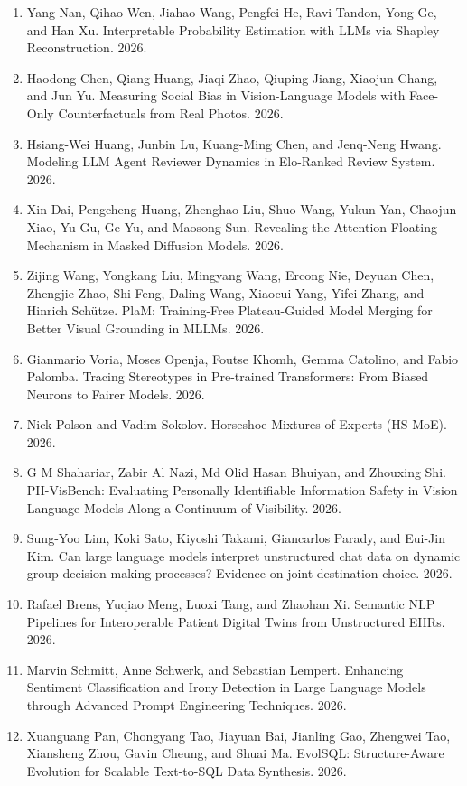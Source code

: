 \documentclass{article}
\begin{document}
\begin{enumerate}
\item
Yang Nan, Qihao Wen, Jiahao Wang, Pengfei He, Ravi Tandon, Yong Ge, and Han Xu. Interpretable Probability Estimation with LLMs via Shapley Reconstruction. 2026.
\item
Haodong Chen, Qiang Huang, Jiaqi Zhao, Qiuping Jiang, Xiaojun Chang, and Jun Yu. Measuring Social Bias in Vision-Language Models with Face-Only Counterfactuals from Real Photos. 2026.
\item
Hsiang-Wei Huang, Junbin Lu, Kuang-Ming Chen, and Jenq-Neng Hwang. Modeling LLM Agent Reviewer Dynamics in Elo-Ranked Review System. 2026.
\item
Xin Dai, Pengcheng Huang, Zhenghao Liu, Shuo Wang, Yukun Yan, Chaojun Xiao, Yu Gu, Ge Yu, and Maosong Sun. Revealing the Attention Floating Mechanism in Masked Diffusion Models. 2026.
\item
Zijing Wang, Yongkang Liu, Mingyang Wang, Ercong Nie, Deyuan Chen, Zhengjie Zhao, Shi Feng, Daling Wang, Xiaocui Yang, Yifei Zhang, and Hinrich Schütze. PlaM: Training-Free Plateau-Guided Model Merging for Better Visual Grounding in MLLMs. 2026.
\item
Gianmario Voria, Moses Openja, Foutse Khomh, Gemma Catolino, and Fabio Palomba. Tracing Stereotypes in Pre-trained Transformers: From Biased Neurons to Fairer Models. 2026.
\item
Nick Polson and Vadim Sokolov. Horseshoe Mixtures-of-Experts (HS-MoE). 2026.
\item
G M Shahariar, Zabir Al Nazi, Md Olid Hasan Bhuiyan, and Zhouxing Shi. PII-VisBench: Evaluating Personally Identifiable Information Safety in Vision Language Models Along a Continuum of Visibility. 2026.
\item
Sung-Yoo Lim, Koki Sato, Kiyoshi Takami, Giancarlos Parady, and Eui-Jin Kim. Can large language models interpret unstructured chat data on dynamic group decision-making processes? Evidence on joint destination choice. 2026.
\item
Rafael Brens, Yuqiao Meng, Luoxi Tang, and Zhaohan Xi. Semantic NLP Pipelines for Interoperable Patient Digital Twins from Unstructured EHRs. 2026.
\item
Marvin Schmitt, Anne Schwerk, and Sebastian Lempert. Enhancing Sentiment Classification and Irony Detection in Large Language Models through Advanced Prompt Engineering Techniques. 2026.
\item
Xuanguang Pan, Chongyang Tao, Jiayuan Bai, Jianling Gao, Zhengwei Tao, Xiansheng Zhou, Gavin Cheung, and Shuai Ma. EvolSQL: Structure-Aware Evolution for Scalable Text-to-SQL Data Synthesis. 2026.

\end{enumerate}
\end{document}
